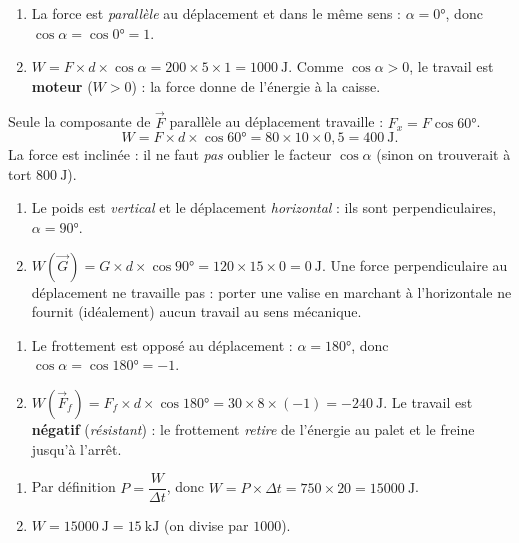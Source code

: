 \documentclass[11pt,a4paper]{article}
\newcommand{\vv}[1]{\vec{#1}}\newcommand{\ds}{\displaystyle}
\begin{document}

\begin{corrige}
\begin{enumerate}[label=\alph*)]
  \item La force est \emph{parallèle} au déplacement et dans le même sens : $\alpha=\ang{0}$, donc
        $\cos\alpha=\cos\ang{0}=1$.
  \item $W=F\times d\times\cos\alpha=200\times5\times1=\qty{1000}{\joule}$. Comme $\cos\alpha>0$, le
        travail est \textbf{moteur} ($W>0$) : la force donne de l'énergie à la caisse.
\end{enumerate}
\end{corrige}

\begin{corrige}
Seule la composante de $\vv F$ parallèle au déplacement travaille : $F_x=F\cos\ang{60}$.
\[
W=F\times d\times\cos\ang{60}=80\times10\times0,5=\qty{400}{\joule}.
\]
La force est inclinée : il ne faut \emph{pas} oublier le facteur $\cos\alpha$ (sinon on trouverait à
tort $800\ \si{\joule}$).
\end{corrige}

\begin{corrige}
\begin{enumerate}[label=\alph*)]
  \item Le poids est \emph{vertical} et le déplacement \emph{horizontal} : ils sont perpendiculaires,
        $\alpha=\ang{90}$.
  \item $W(\vv G)=G\times d\times\cos\ang{90}=120\times15\times0=\qty{0}{\joule}$. Une force
        perpendiculaire au déplacement ne travaille pas : porter une valise en marchant à
        l'horizontale ne fournit (idéalement) aucun travail au sens mécanique.
\end{enumerate}
\end{corrige}

\begin{corrige}
\begin{enumerate}[label=\alph*)]
  \item Le frottement est opposé au déplacement : $\alpha=\ang{180}$, donc $\cos\alpha=\cos\ang{180}=-1$.
  \item $W(\vv F_f)=F_f\times d\times\cos\ang{180}=30\times8\times(-1)=\qty{-240}{\joule}$. Le travail
        est \textbf{négatif} (\emph{résistant}) : le frottement \emph{retire} de l'énergie au palet et
        le freine jusqu'à l'arrêt.
\end{enumerate}
\end{corrige}

\begin{corrige}
\begin{enumerate}[label=\alph*)]
  \item Par définition $P=\dfrac{W}{\Delta t}$, donc $W=P\times\Delta t=750\times20=\qty{15000}{\joule}$.
  \item $W=\qty{15000}{\joule}=\qty{15}{\kilo\joule}$ (on divise par $1000$).
\end{enumerate}
\end{corrige}
\end{document}
